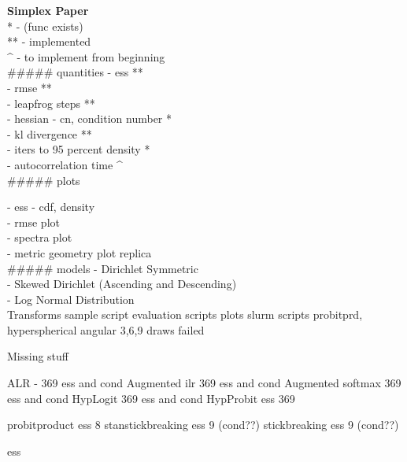 \noindent \textbf{\Huge Simplex Paper}\\[0.3cm]


* - (func exists)\\
** - implemented\\
^ - to implement from beginning\\
##### quantities
- ess **\\
- rmse **\\
- leapfrog steps **\\
- hessian - cn, condition number *\\
- kl divergence **\\
- iters to 95 percent density *\\
- autocorrelation time ^\\

##### plots

- ess - cdf, density\\
- rmse plot\\
- spectra plot\\
- metric geometry plot replica\\

##### models
- Dirichlet Symmetric\\
- Skewed Dirichlet (Ascending and Descending)\\
- Log Normal Distribution\\


Transforms
sample script
evaluation scripts
plots
slurm scripts
probitprd, hyperspherical angular 3,6,9 draws failed

Missing stuff

ALR - 369 ess and cond
Augmented ilr 369 ess and cond
Augmented softmax 369 ess and cond
HypLogit 369 ess and cond
HypProbit ess 369

probitproduct ess 8
stanstickbreaking ess 9 (cond??)
stickbreaking ess 9 (cond??)

ess